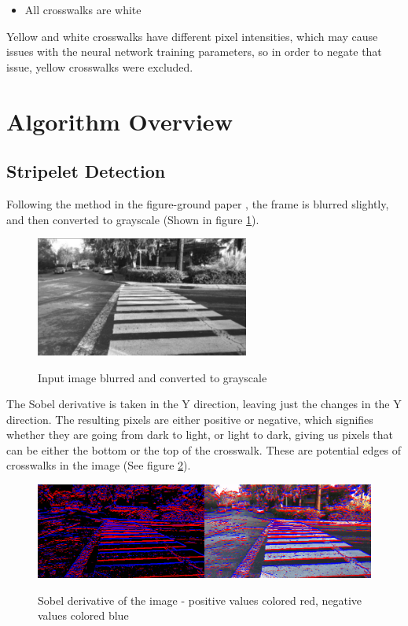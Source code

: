 \documentclass[12pt]{ucthesis}
\newcommand{\captionfonts}{\small\bf\ssp}
\begin{document}
\begin{itemize}
\item All crosswalks are white
\end{itemize}

Yellow and white crosswalks have different pixel intensities, which may cause issues with the neural network training parameters, so in order to negate that issue, yellow crosswalks were excluded. 

\section{Algorithm Overview}
\label{Algorithm Overview}

\subsection{Stripelet Detection}

Following the method in the figure-ground paper \cite{Coughlan2006}, the frame is blurred slightly, and then converted to grayscale (Shown in figure \ref{fig:SlightlyBlurred}). 

\begin{figure}[h!]
\begin{center}
\includegraphics[width=7cm]{SlightlyBlurredInput.png}
\captionfonts
\caption[Grayscale Image]{Input image blurred and converted to grayscale}
\label{fig:SlightlyBlurred}
\end{center}
\end{figure}

The Sobel derivative is taken in the Y direction, leaving just the changes in the Y direction. The resulting pixels are either positive or negative, which signifies whether they are going from dark to light, or light to dark, giving us pixels that can be either the bottom or the top of the crosswalk. These are potential edges of crosswalks in the image (See figure \ref{fig:TopAndBottomSobel}). 

\begin{figure}[h!]
\begin{center}
\includegraphics[width=14cm]{TopAndBottomSobel.png}
\captionfonts
\caption[Sobel Derivative of Crosswalk Image]{Sobel derivative of the image - positive values colored red, negative values colored blue}
\label{fig:TopAndBottomSobel}
\end{center}
\end{figure}
\end{document}
